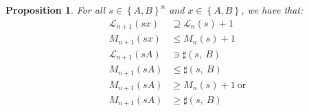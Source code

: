 \documentclass[a4paper,9pt,leqno]{article}
\renewcommand{\=}{\protect\nobreakdash-\hspace{0pt}}
\renewcommand{\~}{\protect\nobreakdash--\hspace{0pt}}
\theoremstyle{plain}
\newtheorem{proposition}[fact]{Proposition}
\theoremstyle{definition}
\theoremstyle{remark}
\newcommand{\txt}[1]{\:\text{#1}\:}
\newcommand{\mc}{,\:}
\newcommand{\lp}{\left(}
\newcommand{\lc}{\left\{}
\newcommand{\rp}{\right)}
\newcommand{\rc}{\right\}}
\begin{document}
\begin{proposition}
For all $s \in \lc A, B\rc^n$ and $x \in \lc A, B\rc$, we have that:
%
\begin{align}
\mathcal{L}_{n+1} \lp s x \rp & \supseteq \mathcal{L}_n \lp s\rp + 1
    \label{LLnsupseteqLLnplus1} \\
M_{n+1} \lp s x \rp & \le M_n \lp s \rp + 1
    \label{Mnplus1geMnplus1} \\
\mathcal{L}_{n+1}\lp s A\rp & \ni\sharp\lp s\mc B\rp
    \label{sharpin}\\
M_{n+1}\lp s A \rp & \le \sharp\lp s\mc B\rp
    \label{Mnplus1lesharp} \\
M_{n+1}\lp s A \rp & \ge M_n\lp s \rp + 1 \txt{or}
    \label{Mnplus1geMnorsharp} \\
M_{n+1}\lp s A \rp & \ge \sharp\lp s\mc B\rp \nonumber
\end{align}
\end{proposition}
\end{document}
